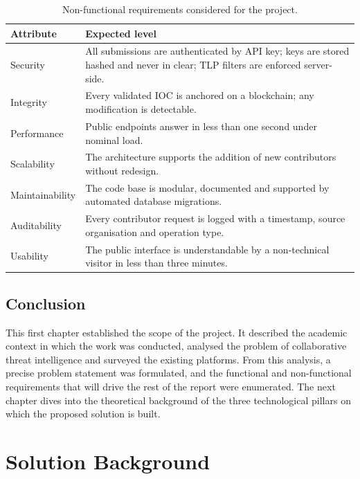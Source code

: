 \documentclass[12pt,a4paper,oneside]{book}
\begin{document}
{{\begin{table}[!h]
\caption{Non-functional requirements considered for the project.}
\label{tab:nfr}
\centering
\renewcommand{\arraystretch}{1.4}
\begin{tabular}{| C{.20\textwidth} | p{.70\textwidth} |}
\hline
\textbf{Attribute} & \textbf{Expected level} \\
\hline\hline
Security & \nohyphens{All submissions are authenticated by API key; keys are stored hashed and never in clear; TLP filters are enforced server-side.} \\
\hline
Integrity & \nohyphens{Every validated IOC is anchored on a blockchain; any modification is detectable.} \\
\hline
Performance & \nohyphens{Public endpoints answer in less than one second under nominal load.} \\
\hline
Scalability & \nohyphens{The architecture supports the addition of new contributors without redesign.} \\
\hline
Maintainability & \nohyphens{The code base is modular, documented and supported by automated database migrations.} \\
\hline
Auditability & \nohyphens{Every contributor request is logged with a timestamp, source organisation and operation type.} \\
\hline
Usability & \nohyphens{The public interface is understandable by a non-technical visitor in less than three minutes.} \\
\hline
\end{tabular}
\end{table}

\section*{Conclusion}
This first chapter established the scope of the project. It described the
academic context in which the work was conducted, analysed the problem of
collaborative threat intelligence and surveyed the existing platforms. From
this analysis, a precise problem statement was formulated, and the
functional and non-functional requirements that will drive the rest of the
report were enumerated. The next chapter dives into the theoretical
background of the three technological pillars on which the proposed
solution is built.

\chapter{Solution Background}
\label{ch:background}
}}
\end{document}
